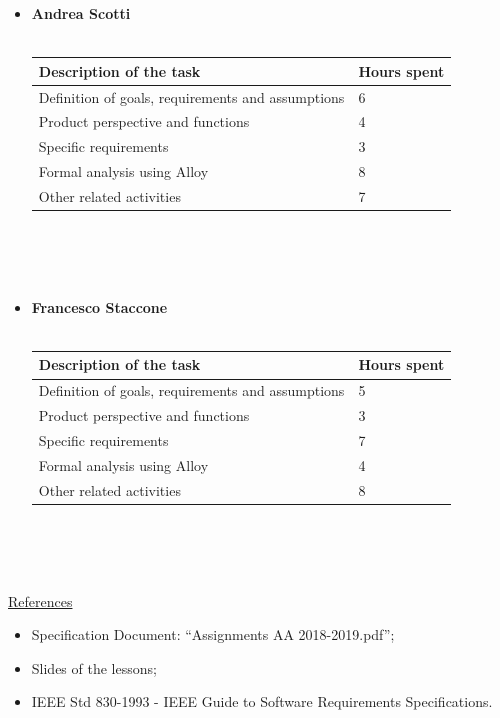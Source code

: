 \documentclass{article}
\begin{document}
\begin{legal}
{\begin{itemize}
		\item \textbf{Andrea Scotti}\\\\
				\begin{tabular}{| m{9cm} | m{3cm}| }
				\hline
					\textbf{Description of the task} & \textbf{Hours spent}\\
				\hline
					Definition of goals, requirements and assumptions & 6 \\
				\hline
					Product perspective and functions & 4 \\
				\hline
					Specific requirements & 3 \\
				\hline
					Formal analysis using Alloy & 8 \\
				\hline
					Other related activities & 7 \\
				\hline
				\end{tabular}
				\\\\\\
		\item \textbf{Francesco Staccone}\\\\
				\begin{tabular}{| m{9cm} | m{3cm}| }
				\hline
					\textbf{Description of the task} & \textbf{Hours spent}\\
				\hline
					Definition of goals, requirements and assumptions & 5 \\
				\hline
					Product perspective and functions & 3 \\
				\hline
					Specific requirements & 7 \\
				\hline
					Formal analysis using Alloy & 4 \\
				\hline
					Other related activities & 8 \\
				\hline
				\end{tabular}
				\\\\\\
		\end{itemize}
		}
	\item \underline{References}\\
		{\normalfont	
			\begin{itemize}
			\item Specification Document: “Assignments AA 2018-2019.pdf”;\\
			\item Slides of the lessons;\\
			\item IEEE Std 830-1993 - IEEE Guide to Software Requirements Specifications.\\
			\end{itemize}
		}
	\end{legal}
\end{document}
